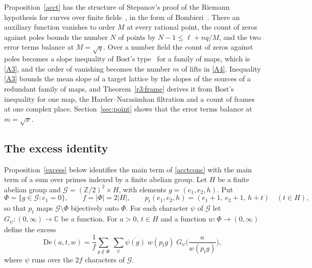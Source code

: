 \begin{remark}\label{rem:stepanov}
Proposition~\ref{acct} has the structure of Stepanov's proof of the Riemann hypothesis for curves over finite fields~\cite{stepanov}, in the form of Bombieri~\cite{bombieri}. There an auxiliary function vanishes to order $M$ at every rational point, the count of zeros against poles bounds the number $N$ of points by $N-1\le\ell+nq/M$, and the two error terms balance at $M=\sqrt q$. Over a number field the count of zeros against poles becomes a slope inequality of Bost's type~\cite{bost} for a family of maps, which is \eqref{A3}, and the order of vanishing becomes the number $m$ of lifts in \eqref{A4}. Inequality \eqref{A3} bounds the mean slope of a target lattice by the slopes of the sources of a redundant family of maps, and Theorem~\ref{r3:frame} derives it from Bost's inequality for one map, the Harder--Narasimhan filtration and a count of frames at one complex place. Section~\ref{sec:point} shows that the error terms balance at $m=\sqrt x$.
\end{remark}

\subsection{The excess identity}\label{sec:excess}

Proposition~\ref{excess} below identifies the main term of \eqref{acctconc} with the main term of a sum over primes indexed by a finite abelian group. Let $H$ be a finite abelian group and $\mathcal G=(\mathbb Z/2)^2\times H$, with elements $g=(e_1,e_2,h)$. Put
\[
\Phi=\{g\in\mathcal G:e_1=0\},\qquad f=\lvert\Phi\rvert=2\lvert H\rvert,\qquad p_t(e_1,e_2,h)=(e_1+1,\,e_2+1,\,h+t)\quad(t\in H),
\]
so that $p_t$ maps $\mathcal G\setminus\Phi$ bijectively onto $\Phi$. For each character $\psi$ of $\mathcal G$ let $G_\psi\colon(0,\infty)\to\mathbb C$ be a function. For $a>0$, $t\in H$ and a function $w\colon\Phi\to(0,\infty)$ define the excess
\begin{equation}\label{De}
\mathrm{De}(a,t,w)=\frac1f\sum_{g\notin\Phi}\ \sum_\psi\overline{\psi(g)}\;w(p_tg)\;G_\psi\Big(\frac a{w(p_tg)}\Big),
\end{equation}
where $\psi$ runs over the $2f$ characters of $\mathcal G$.


